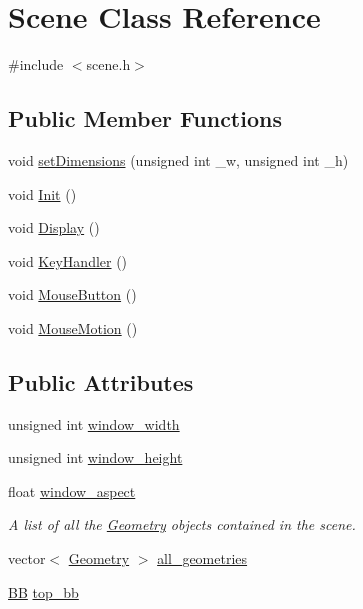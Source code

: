 \hypertarget{class_scene}{\section{Scene Class Reference}
\label{class_scene}
}


{\ttfamily \#include $<$scene.\+h$>$}

\subsection*{Public Member Functions}
\begin{DoxyCompactItemize}
\item 
void \hyperlink{class_scene_a3f438127648e421aa60f541c0170a3bd}{set\+Dimensions} (unsigned int \+\_\+w, unsigned int \+\_\+h)
\item 
void \hyperlink{class_scene_a0f3009b2ffcd55c44ebb1d571bbdd101}{Init} ()
\item 
void \hyperlink{class_scene_af2d712797e49a9137311d92caf9f8df5}{Display} ()
\item 
void \hyperlink{class_scene_aec6d468fc9622d54014b70be497e3d96}{Key\+Handler} ()
\item 
void \hyperlink{class_scene_a782d14ce62ac9ff75f7f20974eac9f65}{Mouse\+Button} ()
\item 
void \hyperlink{class_scene_ab7cbe464954b9782c6a6163d2b5b82b2}{Mouse\+Motion} ()
\end{DoxyCompactItemize}
\subsection*{Public Attributes}
\begin{DoxyCompactItemize}
\item 
unsigned int \hyperlink{class_scene_a08bdf1d4c4029eeb14fe0ac8db9026e5}{window\+\_\+width}
\item 
unsigned int \hyperlink{class_scene_a3ed2bc793472186b711ade7e851ad7d4}{window\+\_\+height}
\item 
float \hyperlink{class_scene_a9bbc3cf3eba479ce7ce0e9cb57df5a7c}{window\+\_\+aspect}
\begin{DoxyCompactList}\small\item\em A list of all the \hyperlink{class_geometry}{Geometry} objects contained in the scene. \end{DoxyCompactList}\item 
vector$<$ \hyperlink{class_geometry}{Geometry} $>$ \hyperlink{class_scene_afbf20a560a77d55a72716aebc2a90e37}{all\+\_\+geometries}
\item 
\hyperlink{class_b_b}{B\+B} \hyperlink{class_scene_a6dd9231972e2cf613be69f51000f0a89}{top\+\_\+bb}
\end{DoxyCompactItemize}


